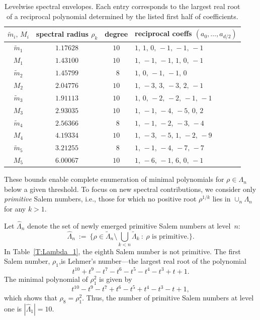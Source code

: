 \documentclass[11pt]{amsart}
\numberwithin{equation}{section}
\begin{document}
\begin{table}[h]
\centering
\begin{tabular}{|c|c|c|l|}
\hline
$\tilde m_i,\,M_i$ & spectral radius $\rho_k$ & degree & reciprocal coeffs $(a_0,\dots,a_{d/2})$ \\ \hline\hline
$\tilde m_1$ & $1.17628$ & $10$ & $1,\,1,\,0,\,-1,\,-1,\,-1$ \\
$M_1$ & $1.43100$ & $10$ & $1,\,-1,\,-1,\,1,\,0,\,-1$ \\
$\tilde m_2$ & $1.45799$ & $\;\,8$ & $1,\,0,\,-1,\,-1,\,0$ \\
$M_2$ & $2.04776$ & $10$ & $1,\,-3,\,3,\,-3,\,2,\,-1$ \\
$\tilde m_3$ & $1.91113$ & $10$ & $1,\,0,\,-2,\,-2,\,-1,\,-1$ \\
$M_3$ & $2.93035$ & $10$ & $1,\,-1,\,-4,\,-5,\,0,\,2$ \\
$\tilde m_4$ & $2.56366$ & $\;\,8$ & $1,\,-1,\,-2,\,-3,\,-4$ \\
$M_4$ & $4.19334$ & $10$ & $1,\,-3,\,-5,\,1,\,-2,\,-9$ \\
$\tilde m_5$ & $3.21255$ & $\;\,8$ & $1,\,-1,\,-4,\,-7,\,-7$ \\
$M_5$ & $6.00067$ & $10$ & $1,\,-6,\,-1,\,6,\,0,\,-1$ \\
\hline
\end{tabular}
\caption{Levelwise spectral envelopes.
Each entry corresponds to the largest real root of a reciprocal polynomial determined by the listed first half of coefficients.}
\label{T:Senvelops}
\end{table}

\medskip
These bounds enable complete enumeration of minimal polynomials for
\(\rho \in \Lambda_n\) below a given threshold.
To focus on new spectral contributions, we consider only
\emph{primitive} Salem numbers, i.e., those for which no positive root
\(\rho^{1/k}\) lies in \(\cup_n \Lambda_n\) for any \(k > 1\).

\medskip
Let \(\hat \Lambda_n\) denote the set of newly emerged primitive Salem numbers
at level~\(n\):
\[
\hat \Lambda_n
\ :=\
\{ \rho \in \tilde \Lambda_n \setminus \bigcup_{k < n} \tilde \Lambda_k\ :\ \rho \text{ is primitive.}\}.
\]
In Table~\ref{T:Lambda_1}, the eighth Salem number is not primitive. The first Salem number, $\rho_1$,is Lehmer's number---the largest real root of the polynomial \[ t^{10}+t^9-t^7-t^6-t^5-t^4-t^3+t+1.\] The minimal polynomial of $\rho_1^2$ is given by 
\[ t^{10}-t^9-t^7+t^6-t^5+t^4-t^3-t+1, \] which shows that $\rho_8=\rho_1^2$. 
Thus, the number of primitive Salem numbers at level one is \(|\hat \Lambda_1| = 10\).
\end{document}
